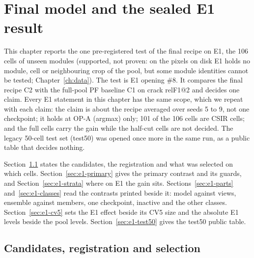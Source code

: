 \chapter{Final model and the sealed E1 result}\label{ch:e1_result}

This chapter reports the one pre-registered test of the final recipe on E1, the 106 cells of unseen modules (supported, not
proven: on the pixels on disk E1 holds no module, cell or neighbouring crop of the pool, but some module identities cannot be
tested; Chapter~\ref{ch:data}). The test is E1 opening \#8. It compares the final recipe C2 with the full-pool PF baseline C1
on crack relF1@2 and decides one claim. Every E1 statement in this chapter has the same scope, which we repeat with each claim: the
claim is about the recipe averaged over seeds 5 to 9, not one checkpoint; it holds at OP-A (argmax) only; 101 of the
106 cells are CSIR cells; and the full cells carry the gain while the half-cut cells are not decided. The legacy 50-cell test
set (test50) was opened once more in the same run, as a public table that decides nothing.

Section~\ref{sec:e1-registration} states the candidates, the registration and what was selected on which cells.
Section~\ref{sec:e1-primary} gives the primary contrast and its guards, and Section~\ref{sec:e1-strata} where on E1 the gain
sits. Sections~\ref{sec:e1-parts} and~\ref{sec:e1-classes} read the contrasts printed beside it: model against views, ensemble
against members, one checkpoint, inactive and the other classes. Section~\ref{sec:e1-cv5} sets the E1 effect beside its CV5
size and the absolute E1 levels beside the pool levels. Section~\ref{sec:e1-test50} gives the test50 public table.

\section{Candidates, registration and selection}\label{sec:e1-registration}

